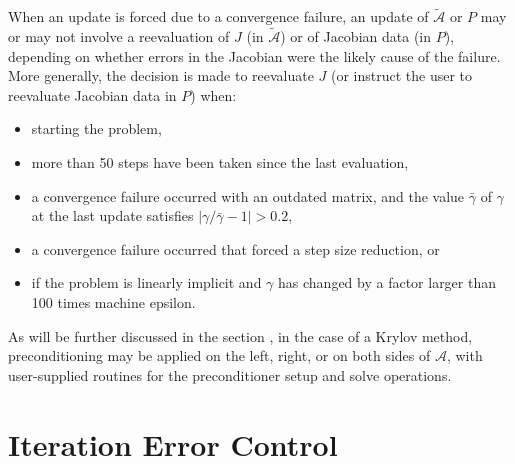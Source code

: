 \documentclass[letterpaper,10pt,english]{sphinxmanual}
\begin{document}
When an update is forced due to a convergence failure, an update of
\(\tilde{\mathcal A}\) or \(P\) may or may not involve a reevaluation of
\(J\) (in \(\tilde{\mathcal A}\)) or of Jacobian data (in \(P\)),
depending on whether errors in the Jacobian were the likely cause of the
failure.  More generally, the decision is made to reevaluate \(J\)
(or instruct the user to reevaluate Jacobian data in \(P\)) when:
\begin{itemize}
\item {} 
starting the problem,

\item {} 
more than 50 steps have been taken since the last evaluation,

\item {} 
a convergence failure occurred with an outdated matrix, and the
value \(\bar{\gamma}\) of \(\gamma\) at the last update
satisfies \(\left|\gamma/\bar{\gamma} - 1\right| > 0.2\),

\item {} 
a convergence failure occurred that forced a step size reduction, or

\item {} 
if the problem is linearly implicit and \(\gamma\) has
changed by a factor larger than 100 times machine epsilon.

\end{itemize}

As will be further discussed in the section
{\hyperref[Mathematics:mathematics-preconditioning]{\emph{}}}, in the case of a Krylov method,
preconditioning may be applied on the left, right, or on both sides of
\({\mathcal A}\), with user-supplied routines for the preconditioner setup
and solve operations.


\section{Iteration Error Control}
\label{Mathematics:mathematics-error}\label{Mathematics:iteration-error-control}
\end{document}
